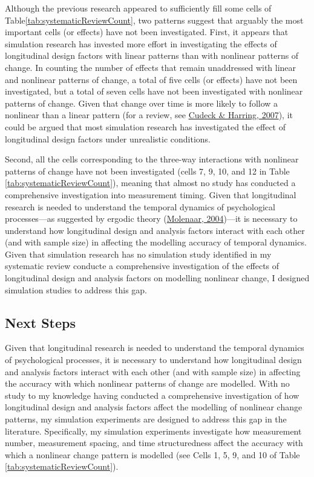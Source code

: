 \documentclass[
12pt, %
twoside,
english]{guelphthesis}
\begin{document}
Although the previous research appeared to sufficiently fill some cells of Table\ref{tab:systematicReviewCount}, two patterns suggest that arguably the most important cells (or effects) have not been investigated. First, it appears that simulation research has invested more effort in investigating the effects of longitudinal design factors with linear patterns than with nonlinear patterns of change. In counting the number of effects that remain unaddressed with linear and nonlinear patterns of change, a total of five cells (or effects) have not been investigated, but a total of seven cells have not been investigated with nonlinear patterns of change. Given that change over time is more likely to follow a nonlinear than a linear pattern (for a review, see \protect\hyperlink{ref-cudeck2007}{Cudeck \& Harring, 2007}), it could be argued that most simulation research has investigated the effect of longitudinal design factors under unrealistic conditions.

Second, all the cells corresponding to the three-way interactions with nonlinear patterns of change have not been investigated (cells 7, 9, 10, and
12 in Table \ref{tab:systematicReviewCount}), meaning that almost no study has conducted a comprehensive investigation into measurement timing. Given that longitudinal research is needed to understand the temporal dynamics of psychological processes---as suggested by ergodic theory (\protect\hyperlink{ref-molenaar2004}{Molenaar, 2004})---it is necessary to understand how longitudinal design and analysis factors interact with each other (and with sample size) in affecting the modelling accuracy of temporal dynamics. Given that simulation research has no simulation study identified in my systematic review conducte a comprehensive investigation of the effects of longitudinal design and analysis factors on modelling nonlinear change, I designed simulation studies to address this gap.

\hypertarget{next-steps}{%
\subsection{Next Steps}\label{next-steps}}

Given that longitudinal research is needed to understand the temporal dynamics of psychological processes, it is necessary to understand how longitudinal design and analysis factors interact with each other (and with sample size) in affecting the accuracy with which nonlinear patterns of change are modelled. With no study to my knowledge having conducted a comprehensive investigation of how longitudinal design and analysis factors affect the modelling of nonlinear change patterns, my simulation experiments are designed to address this gap in the literature. Specifically, my simulation experiments investigate how measurement number, measurement spacing, and time structuredness affect the accuracy with which a nonlinear change pattern is modelled (see Cells 1, 5, 9, and 10 of Table \ref{tab:systematicReviewCount}).
\end{document}
